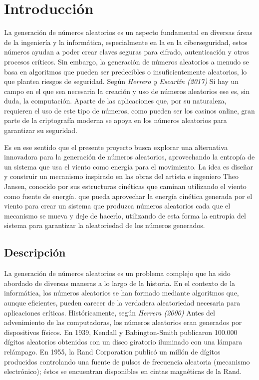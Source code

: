 \section{Introducción}
La generación de números aleatorios es un aspecto fundamental en diversas áreas de la ingeniería y la informática, especialmente en la en la ciberseguridad, estos números ayudan a poder crear claves seguras para cifrado, autenticación y otros procesos críticos. Sin embargo, la generación de números aleatorios a menudo se basa en algoritmos que pueden ser predecibles o insuficientemente aleatorios, lo que plantea riesgos de seguridad. Según \textit{Herrero y Escartín (2017)} Si hay un campo en el que sea necesaria la creación y uso de números aleatorios ese es, sin duda, la computación. Aparte de las aplicaciones que, por su naturaleza, requieren el uso de este tipo de números, como pueden ser los casinos online, gran parte de la criptografía moderna se apoya en los números aleatorios para garantizar su seguridad. \cite{herrero2017fisica}

Es en ese sentido que el presente proyecto busca explorar una alternativa innovadora para la generación de números aleatorios, aprovechando la entropía de un sistema que usa el viento como energía para el movimiento. La idea es diseñar y construir un mecanismo inspirado en las obras del artista e ingeniero Theo Jansen, conocido por sus estructuras cinéticas que caminan utilizando el viento como fuente de energía. \cite{Nansai2013} que pueda aprovechar la energía cinética generada por el viento para crear un sistema que produzca números aleatorios cada que el mecanismo se mueva y deje de hacerlo, utilizando de esta forma la entropía del sistema para garantizar la aleatoriedad de los números generados. \cite{PachecoHernndez2021}

\subsection{Descripción}

La generación de números aleatorios es un problema complejo que ha sido abordado de diversas maneras a lo largo de la historia. En el contexto de la informática, los números aleatorios se han formado mediante algoritmos que, aunque eficientes, pueden carecer de la verdadera aleatoriedad necesaria para aplicaciones críticas. Históricamente, según \textit{Herrera (2000)} Antes del advenimiento de las computadoras, los números aleatorios eran generados por dispositivos físicos. En 1939, Kendall y Babington-Smith publicaron 100.000 dígitos aleatorios obtenidos con un disco giratorio iluminado con una lámpara relámpago. En 1955, la Rand Corporation publicó un millón de dígitos producidos controlando una fuente de pulsos de frecuencia aleatoria (mecanismo electrónico); éstos se encuentran disponibles en cintas magnéticas de la Rand. \cite{herrera2000numeros}

